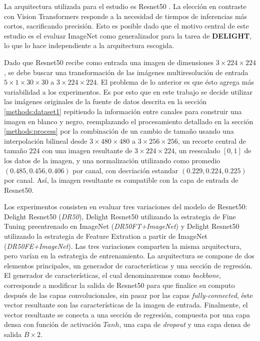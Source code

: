 \documentclass[../tesis.tex]{subfiles}
\begin{document}
La arquitectura utilizada para el estudio es Resnet50 \cite{resnet}. La elección en contraste con Vision Transformers responde a la necesidad de tiempos de inferencias más cortos, sacrificando precisión. Esto es posible dado que el motivo central de este estudio es el evaluar ImageNet como generalizador para la tarea de \textbf{DELIGHT}, lo que lo hace independiente a la arquitectura escogida.\par\null\par

Dado que Resnet50 recibe como entrada una imagen de dimensiones $3\times224\times224$, se debe buscar una transformación de las imágenes multiresolución de entrada $5\times1\times30\times30$ a $3\times224\times224$. El problema de lo anterior es que ésto agrega más variabilidad a los experimentos. Es por esto que en este trabajo se decide utilizar las imágenes originales de la fuente de datos descrita en la sección \ref{methods:dataset1} repitiendo la información entre canales para construir una imagen en blanco y negro, reemplazando el procesamiento detallado en la sección \ref{methods:process} por la combinación de un cambio de tamaño usando una interpolación bilineal desde $3\times480\times480$ a $3\times256\times256$, un recorte central de tamaño $224$ con una imagen resultante de $3\times224\times224$, un reescalado $[0, 1]$ de los datos de la imagen, y una normalización utilizando como promedio $(0.485, 0.456, 0.406)$ por canal, con desviación estandar $(0.229, 0.224, 0.225)$ por canal. Así, la imagen resultante es compatible con la capa de entrada de Resnet50.\par\null\par

Los experimentos consisten en evaluar tres variaciones del modelo de Resnet50: Delight Resnet50 (\textit{DR50}), Delight Resnet50 utilizando la estrategia de Fine Tuning preentrenado en ImageNet (\textit{DR50FT+ImageNet}) y Delight Resnet50 utilizando la estrategia de Feature Extration a partir de ImageNet (\textit{DR50FE+ImageNet}). Las tres variaciones comparten la misma arquitectura, pero varían en la estrategia de entrenamiento. La arquitectura se compone de dos elementos principales, un generador de características y una sección de regresión. El generador de características, el cual denominaremos como \textit{backbone}, corresponde a modificar la salida de Resnet50 para que finalice su computo después de las capas convolucionales, sin pasar por las capas \textit{fully-connected}, éste vector resultante son las características de la imagen de entrada. Finalmente, el vector resultante se conecta a una sección de regresión, compuesta por una capa densa con función de activación $Tanh$, una capa de \textit{dropout} y una capa densa de salida $B\times2$.\par\null\par
\end{document}
